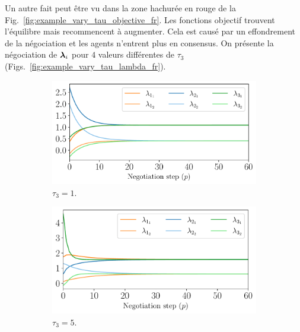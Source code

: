 \documentclass[../main.tex]{subfiles}
\begin{document}
Un autre fait peut être vu dans la zone hachurée en rouge de la Fig.~\ref{fig:example_vary_tau_objective_fr}.
Les fonctions objectif trouvent l'équilibre mais recommencent à augmenter.
Cela est causé par un effondrement de la négociation et les agents n'entrent plus en consensus.
On présente la négociation de $\boldsymbol{\lambda}_{i}$ pour $4$ valeurs différentes de $\tau_{3}$ (Figs.~\ref{fig:example_vary_tau_lambda_fr}).

\begin{figure}[h]
  \centering
  \begin{subfigure}{0.45\textwidth}
    \includegraphics[width=\textwidth]{../img/example_primal_decomposition/example_vary_tau_lambda_tau_1.0.pdf}
    \caption{$\tau_{3}=1$.}\label{fig:example_vary_tau_lambda_tau_1}
  \end{subfigure}
  \begin{subfigure}{0.45\textwidth}
    \includegraphics[width=\textwidth]{../img/example_primal_decomposition/example_vary_tau_lambda_tau_5.0.pdf}
    \caption{$\tau_{3}=5$.}\label{fig:example_vary_tau_lambda_tau_5}
  \end{subfigure}
  \\~\\
  \begin{subfigure}{0.45\textwidth}

\end{subfigure}
\end{figure}
\end{document}
